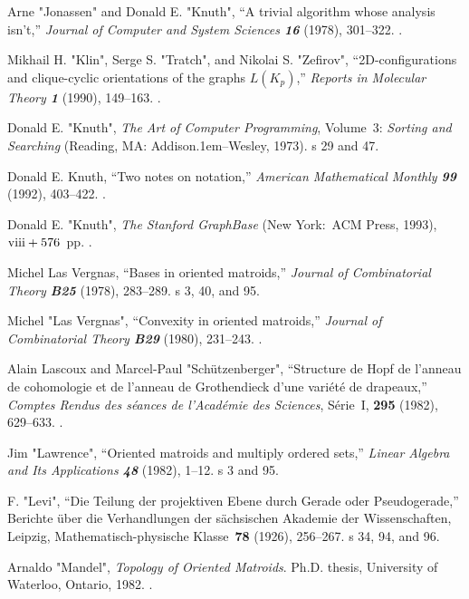\bib[43]
Arne "Jonassen" and Donald E. "Knuth", ``A trivial algorithm whose
analysis isn't,''
{\sl Journal of Computer and System Sciences\/ \bf 16} (1978), 301--322.
.

\bib[44]
Mikhail H. "Klin", Serge S. "Tratch", and Nikolai S. "Zefirov",
``2D-configurations
and clique-cyclic orientations of the graphs $L(K_p)$,'' {\sl Reports
in Molecular Theory\/ \bf1} (1990), 149--163.
.

\bib[45]
Donald E. "Knuth", 
{\sl The Art of Computer Programming}, Volume~3:  {\sl Sorting and Searching}
(Reading, {\ninerm MA}: Addison\kern.1em--Wesley, 1973).
\>s 29 and 47.

\bib[46]
Donald E. Knuth, ``Two notes on notation,'' {\sl American Mathematical
Monthly\/ \bf99} (1992), 403--422.
.

\bib[47]
Donald E. "Knuth", {\sl The Stanford GraphBase\/} (New York:\ ACM Press, 1993), $\rm viii+576$~pp.
.

\bib[48]
Michel Las Vergnas, ``Bases in oriented matroids,'' {\sl Journal
of Combinatorial Theory\/ \bf B25} (1978), 283--289.
\>s 3, 40, and 95.

\bib[49]
Michel "Las Vergnas", ``Convexity in oriented matroids,'' {\sl Journal
of Combinatorial Theory\/ \bf B29} (1980), 231--243.
.

\bib[50]
Alain Lascoux and Marcel-Paul "Sch\"utzenberger",
``Structure de Hopf de l'anneau de cohomologie et de l'anneau de
Grothendieck d'une vari\'et\'e de drapeaux,''
{\sl Comptes Rendus des s\'eances de l'Acad\'emie des Sciences},
 S\'erie~I, {\bf295} (1982), 629--633.
.

\bib[51]
Jim "Lawrence", ``Oriented matroids and multiply ordered sets,'' {\sl
Linear Algebra and Its Applications\/ \bf 48} (1982), 1--12.
\>s 3 and 95.

\bib[52]
F. "Levi", ``Die Teilung der projektiven Ebene durch Gerade oder
Pseudo\-gerade,''
Berichte \"uber die Verhandlungen der s\"achsischen Akademie der
Wissenschaften, Leipzig, Mathema\-tisch-physische Klasse~{\bf 78}
(1926), 256--267.
\>s 34, 94, and 96.


\bib[53]
Arnaldo  "Mandel", {\sl Topology of Oriented Matroids}. Ph.D. thesis,
University of Waterloo, Ontario, 1982.
.


